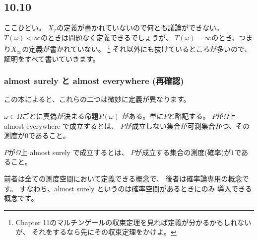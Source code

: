     \subsection{10.10}
      ここひどい。
      $X_T$の定義が書かれていないので何とも議論ができない。
      $T(\omega) < \infty$のときは問題なく定義できるでしょうが、
      $T(\omega) = \infty$のとき、つまり$X_{\infty}$の定義が書かれていない。
      \footnote{Chapter 11のマルチンゲールの収束定理を見れば定義が分かるかもしれないが、
      それをするなら先にその収束定理をかけよ。}
      それ以外にも抜けているところが多いので、
      証明をすべて書いていきます。

      \subsubsection{almost surely と almost everywhere (再確認)}
        この本によると、これらの二つは微妙に定義が異なります。

        $\omega \in \Omega$ごとに真偽が決まる命題$P(\omega)$
        がある。単に$P$と略記する。
        $P$が$\Omega$上 almost everywhere で成立するとは、
        $P$が成立しない集合が可測集合かつ、その測度が0であること。

        $P$が$\Omega$上 almost surely で成立するとは、
        $P$が成立する集合の測度(確率)が$1$であること。

        前者は全ての測度空間において定義できる概念で、
        後者は確率論専用の概念です。
        すなわち、almost surely というのは確率空間があるときにのみ
        導入できる概念です。

